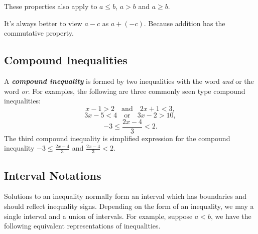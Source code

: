 \documentclass[en,11pt]{latex/elegantbookr}
\theoremstyle{definition}
\theoremstyle{definition}
\theoremstyle{definition}
\theoremstyle{remark}
\let\BeginKnitrBlock\begin \let\EndKnitrBlock\end
\begin{document}
\BeginKnitrBlock{rmdnote}
These properties also apply to \(a\leq b\), \(a>b\) and \(a\geq b\).
\EndKnitrBlock{rmdnote}

\BeginKnitrBlock{rmdnote}
It's always better to view \(a-c\) as \(a+(-c)\). Because addition has the commutative property.
\EndKnitrBlock{rmdnote}

\hypertarget{compound-inequalities}{%
\subsection*{Compound Inequalities}\label{compound-inequalities}}

A \textbf{\emph{compound inequality}} is formed by two inequalities with the word \emph{and} or the word \emph{or}. For examples, the following are three commonly seen type compound inequalities:
\[
x-1>2\quad \text{and} \quad 2x+1<3,
\]
\[
3x-5<4\quad \text{or} \quad 3x-2>10,
\]
\[
-3\leq \frac{2x-4}{3}<2.
\]
The third compound inequality is simplified expression for the compound inequality \(-3\leq \frac{2x-4}{3}\) and \(\frac{2x-4}{3}<2\).

\hypertarget{interval-notations}{%
\subsection*{Interval Notations}\label{interval-notations}}

Solutions to an inequality normally form an interval which has boundaries and should reflect inequality signs. Depending on the form of an inequality, we may a single interval and a union of intervals. For example, suppose \(a<b\), we have the following equivalent representations of inequalities.
\end{document}
